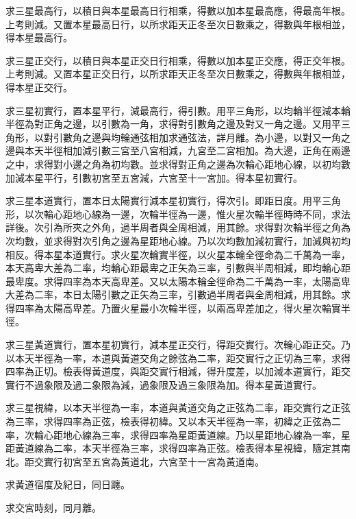 \begin{pinyinscope}
求三星最高行，以積日與本星最高日行相乘，得數以加本星最高應，得最高年根。上考則減。又置本星最高日行，以所求距天正冬至次日數乘之，得數與年根相並，得本星最高行。

求三星正交行，以積日與本星正交日行相乘，得數以加本星正交應，得正交年根。上考則減。又置本星正交日行，以所求距天正冬至次日數乘之，得數與年根相並，得本星正交行。

求三星初實行，置本星平行，減最高行，得引數。用平三角形，以均輪半徑減本輪半徑為對正角之邊，以引數為一角，求得對引數角之邊及對又一角之邊。又用平三角形，以對引數角之邊與均輪通弦相加求通弦法，詳月離。為小邊，以對又一角之邊與本天半徑相加減引數三宮至八宮相減，九宮至二宮相加。為大邊，正角在兩邊之中，求得對小邊之角為初均數。並求得對正角之邊為次輪心距地心線，以初均數加減本星平行，引數初宮至五宮減，六宮至十一宮加。得本星初實行。

求三星本道實行，置本日太陽實行減本星初實行，得次引。即距日度。用平三角形，以次輪心距地心線為一邊，次輪半徑為一邊，惟火星次輪半徑時時不同，求法詳後。次引為所夾之外角，過半周者與全周相減，用其餘。求得對次輪半徑之角為次均數，並求得對次引角之邊為星距地心線。乃以次均數加減初實行，加減與初均相反。得本星本道實行。求火星次輪實半徑，以火星本輪全徑命為二千萬為一率，本天高卑大差為二率，均輪心距最卑之正矢為三率，引數與半周相減，即均輪心距最卑度。求得四率為本天高卑差。又以太陽本輪全徑命為二千萬為一率，太陽高卑大差為二率，本日太陽引數之正矢為三率，引數過半周者與全周相減，用其餘。求得四率為太陽高卑差。乃置火星最小次輪半徑，以兩高卑差加之，得火星次輪實半徑。

求三星黃道實行，置本星初實行，減本星正交行，得距交實行。次輪心距正交。乃以本天半徑為一率，本道與黃道交角之餘弦為二率，距交實行之正切為三率，求得四率為正切。檢表得黃道度，與距交實行相減，得升度差，以加減本道實行，距交實行不過象限及過二象限為減，過象限及過三象限為加。得本星黃道實行。

求三星視緯，以本天半徑為一率，本道與黃道交角之正弦為二率，距交實行之正弦為三率，求得四率為正弦，檢表得初緯。又以本天半徑為一率，初緯之正弦為二率，次輪心距地心線為三率，求得四率為星距黃道線。乃以星距地心線為一率，星距黃道線為二率，本天半徑為三率，求得四率為正弦。檢表得本星視緯，隨定其南北。距交實行初宮至五宮為黃道北，六宮至十一宮為黃道南。

求黃道宿度及紀日，同日躔。

求交宮時刻，同月離。


\end{pinyinscope}
